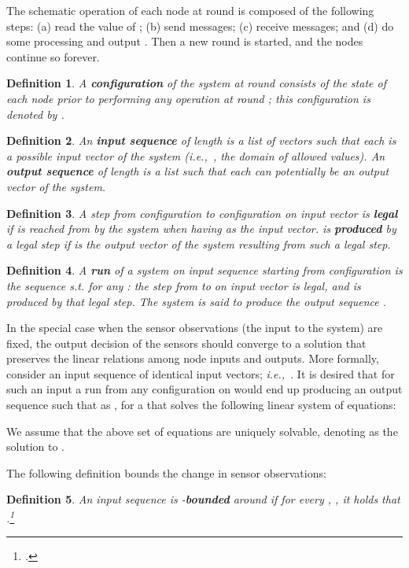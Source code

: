 \documentclass[preprint,12pt]{elsarticle}
\newtheorem{definition}{Definition}
\newcommand{\ie}{\emph{i.e.,\ }}
\begin{document}
The schematic operation of each node  at round  is
composed of the following steps: (a) read the value of
; (b) send messages; (c) receive messages; and (d) do
some processing and output . Then a new round is
started, and the nodes continue so forever.

\begin{definition}
  A {\bf configuration}  of the system at round  consists of the state
  of each node prior to performing any operation at round ;
  this configuration is denoted by .
\end{definition}

\begin{definition}
  An {\bf input sequence}  of length  is a list of   vectors such that each 
  is a possible input vector of the system (\ie , the domain of allowed values).
  An {\bf output sequence}  of length  is a list
  such that each 
  can potentially be an output vector of the system.
\end{definition}

\begin{definition}
  A step from configuration  to configuration  on input vector
   is {\bf legal} if  is reached from  by the
  system when having  as the input vector.
 is {\bf produced} by a legal step if
   is the output vector of the system resulting from such a legal step.
\end{definition}

\begin{definition}
  A {\bf run} of a system on input sequence  starting
  from configuration  is the sequence 
  s.t. for any : the step from  to  on input vector
   is legal, and   is produced by that
  legal step. The system is said to produce the output sequence
  .
\end{definition}

In the special case when the sensor observations (the input to the
system) are fixed, the output decision of the sensors should converge to
a solution that preserves the linear relations among node inputs
and outputs. More formally, consider an input sequence
 of identical input vectors; \ie . It is desired that for such an input a run
from any configuration  on  would end up
producing an output sequence  such that  as , for a  that solves the following linear
system of equations:

We assume that the above set of equations are uniquely solvable, denoting
 as the solution to .


The following definition bounds the change in sensor observations:
\begin{definition}\label{def:concentrated}
  An input sequence  is -{\bf bounded} around
   if for every , , it holds that .\footnote{.}
\end{definition}
\end{document}
